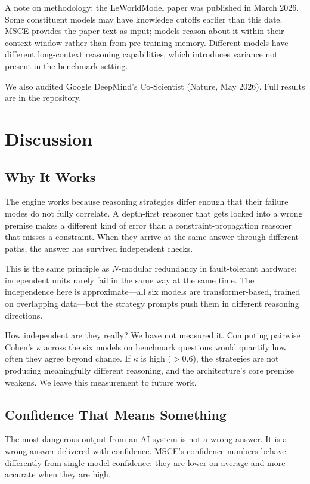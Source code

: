 \documentclass[11pt,a4paper]{article}
\begin{document}
A note on methodology: the LeWorldModel paper was published in March 2026. Some constituent models may have knowledge cutoffs earlier than this date. MSCE provides the paper text as input; models reason about it within their context window rather than from pre-training memory. Different models have different long-context reasoning capabilities, which introduces variance not present in the benchmark setting.

We also audited Google DeepMind's Co-Scientist (Nature, May 2026). Full results are in the repository.

\section{Discussion}

\subsection{Why It Works}

The engine works because reasoning strategies differ enough that their failure modes do not fully correlate. A depth-first reasoner that gets locked into a wrong premise makes a different kind of error than a constraint-propagation reasoner that misses a constraint. When they arrive at the same answer through different paths, the answer has survived independent checks.

This is the same principle as $N$-modular redundancy in fault-tolerant hardware: independent units rarely fail in the same way at the same time. The independence here is approximate---all six models are transformer-based, trained on overlapping data---but the strategy prompts push them in different reasoning directions.

How independent are they really? We have not measured it. Computing pairwise Cohen's $\kappa$ across the six models on benchmark questions would quantify how often they agree beyond chance. If $\kappa$ is high ($>$0.6), the strategies are not producing meaningfully different reasoning, and the architecture's core premise weakens. We leave this measurement to future work.

\subsection{Confidence That Means Something}

The most dangerous output from an AI system is not a wrong answer. It is a wrong answer delivered with confidence. MSCE's confidence numbers behave differently from single-model confidence: they are lower on average and more accurate when they are high.
\end{document}
